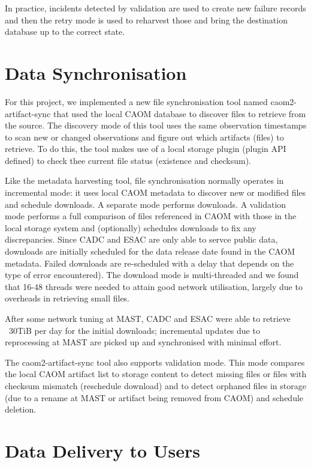 \documentclass[11pt,twoside]{article}
\begin{document}
In practice, incidents detected by validation are used to create new failure records and then the retry mode is used to reharvest those and bring the destination database up to the correct state.

\section{Data Synchronisation}

For this project, we implemented a new file synchronisation tool named caom2-artifact-sync that used the local CAOM database to discover files to retrieve from the source. The discovery mode of this tool uses the same observation timestamps to scan new or changed observations and figure out which artifacts (files) to retrieve. To do this, the tool makes use of a local storage plugin (plugin API defined) to check thee current file status (existence and checksum).

Like the metadata harvesting tool, file synchronisation normally operates in incremental mode: it uses local CAOM metadata to discover new or modified files and schedule downloads. A separate mode performs downloads. A validation mode performs a full comparison of files referenced in CAOM with those in the local storage system and (optionally) schedules downloads to fix any discrepancies. Since CADC and ESAC are only able to servce public data, downloads are initially scheduled for the data release date found in the CAOM metadata. Failed downloads are re-scheduled with a delay that depends on the type of error encountered). The download mode is multi-threaded and we found that 16-48 threads were needed to attain good network utilisation, largely due to overheads in retrieving small files. 

After some network tuning at MAST, CADC and ESAC were able to retrieve ~30TiB per day for the initial downloads; incremental updates due to reprocessing at MAST are picked up and synchronised with minimal effort.

The caom2-artifact-sync tool also supports validation mode. This mode compares the local CAOM artifact list to storage content to detect missing files or files with checksum mismatch (reschedule download) and to detect orphaned files in storage (due to a rename at MAST or artifact being removed from CAOM) and schedule deletion.

\section{Data Delivery to Users}
\end{document}
